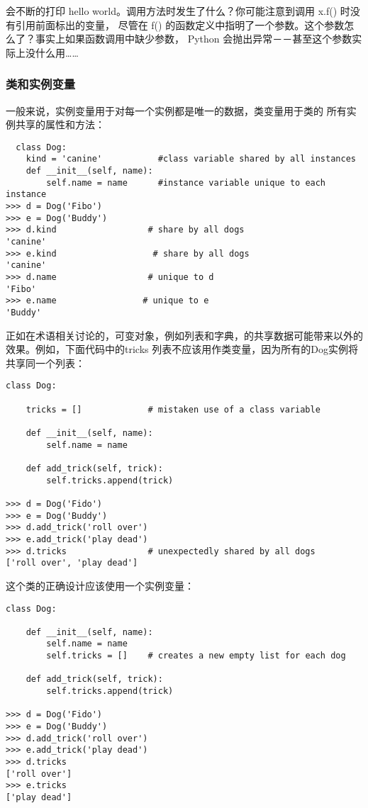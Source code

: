 \documentclass[UTF8]{ctexart}
\begin{document}
会不断的打印 hello world。调用方法时发生了什么？你可能注意到调用 x.f() 时没有引用前面标出的变量，
尽管在 f() 的函数定义中指明了一个参数。这个参数怎么了？事实上如果函数调用中缺少参数，
Python 会抛出异常－－甚至这个参数实际上没什么用……

\subsubsection{类和实例变量}
一般来说，实例变量用于对每一个实例都是唯一的数据，类变量用于类的 所有实例共享的属性和方法：
\begin{verbatim}
  class Dog:
    kind = 'canine'           #class variable shared by all instances
    def __init__(self, name):
        self.name = name      #instance variable unique to each instance
>>> d = Dog('Fibo')
>>> e = Dog('Buddy')
>>> d.kind                  # share by all dogs
'canine'
>>> e.kind                   # share by all dogs
'canine'
>>> d.name                  # unique to d
'Fibo'
>>> e.name                 # unique to e
'Buddy'
\end{verbatim}

正如在术语相关讨论的，可变对象，例如列表和字典，的共享数据可能带来以外的效果。例如，下面代码中的tricks
列表不应该用作类变量，因为所有的Dog实例将共享同一个列表：
\begin{verbatim}
class Dog:

    tricks = []             # mistaken use of a class variable

    def __init__(self, name):
        self.name = name

    def add_trick(self, trick):
        self.tricks.append(trick)

>>> d = Dog('Fido')
>>> e = Dog('Buddy')
>>> d.add_trick('roll over')
>>> e.add_trick('play dead')
>>> d.tricks                # unexpectedly shared by all dogs
['roll over', 'play dead']
\end{verbatim}

这个类的正确设计应该使用一个实例变量：
\begin{verbatim}
class Dog:

    def __init__(self, name):
        self.name = name
        self.tricks = []    # creates a new empty list for each dog

    def add_trick(self, trick):
        self.tricks.append(trick)

>>> d = Dog('Fido')
>>> e = Dog('Buddy')
>>> d.add_trick('roll over')
>>> e.add_trick('play dead')
>>> d.tricks
['roll over']
>>> e.tricks
['play dead']
\end{verbatim}
\end{document}
